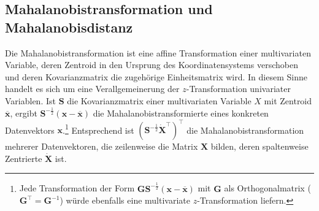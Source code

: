 \subsection{Mahalanobistransformation und Mahalanobisdistanz}
\label{sec:mahaDist}

Die Mahalanobistransformation ist eine affine Transformation einer multivariaten Variable, deren Zentroid in den Ursprung des Koordinatensystems verschoben und deren Kovarianzmatrix die zugehörige Einheitsmatrix wird. In diesem Sinne handelt es sich um eine Verallgemeinerung der $z$-Transformation univariater Variablen. Ist $\bm{S}$ die Kovarianzmatrix einer multivariaten Variable $X$ mit Zentroid $\overline{\bm{x}}$, ergibt $\bm{S}^{-\frac{1}{2}} (\bm{x}-\overline{\bm{x}})$ die Mahalanobistransformierte eines konkreten Datenvektors $\bm{x}$.\footnote{Jede Transformation der Form $\bm{G} \bm{S}^{-\frac{1}{2}} (\bm{x}-\overline{\bm{x}})$ mit $\bm{G}$ als Orthogonalmatrix ($\bm{G}^{\top} = \bm{G}^{-1}$) würde ebenfalls eine multivariate $z$-Transformation liefern.} Entsprechend ist $(\bm{S}^{-\frac{1}{2}} \dot{\bm{X}}^{\top})^{\top}$ die Mahalanobistransformation mehrerer Datenvektoren, die zeilenweise die Matrix $\bm{X}$ bilden, deren spaltenweise Zentrierte $\dot{\bm{X}}$ ist.

